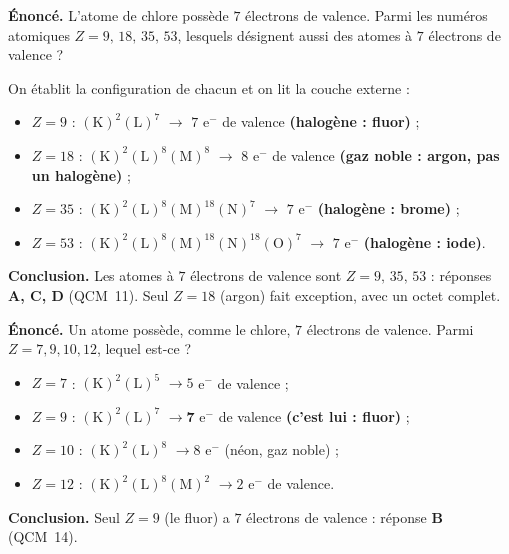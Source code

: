 \documentclass[11pt,a4paper]{article}
\begin{document}
\begin{exemple}
\textbf{Énoncé.} L'atome de chlore possède $7$ électrons de valence. Parmi les numéros atomiques
$Z = 9,\,18,\,35,\,53$, lesquels désignent aussi des atomes à $7$ électrons de valence ?

\smallskip
On établit la configuration de chacun et on lit la couche externe :
\begin{itemize}[leftmargin=1.6em,topsep=2pt,itemsep=2pt]
  \item $Z = 9$ : $(\mathrm{K})^2(\mathrm{L})^7$ \;$\to$\; $7$ e$^-$ de valence \;\textbf{\textcolor{excol}{(halogène : fluor)}} ;
  \item $Z = 18$ : $(\mathrm{K})^2(\mathrm{L})^8(\mathrm{M})^8$ \;$\to$\; $8$ e$^-$ de valence
        \;\textbf{\textcolor{attncol}{(gaz noble : argon, pas un halogène)}} ;
  \item $Z = 35$ : $(\mathrm{K})^2(\mathrm{L})^8(\mathrm{M})^{18}(\mathrm{N})^7$ \;$\to$\; $7$ e$^-$
        \;\textbf{\textcolor{excol}{(halogène : brome)}} ;
  \item $Z = 53$ : $(\mathrm{K})^2(\mathrm{L})^8(\mathrm{M})^{18}(\mathrm{N})^{18}(\mathrm{O})^7$
        \;$\to$\; $7$ e$^-$ \;\textbf{\textcolor{excol}{(halogène : iode)}}.
\end{itemize}
\textbf{Conclusion.} Les atomes à $7$ électrons de valence sont $Z = 9,\,35,\,53$ : réponses
\textbf{A, C, D} (QCM~11). Seul $Z = 18$ (argon) fait exception, avec un octet complet.
\end{exemple}

\begin{exemple}
\textbf{Énoncé.} Un atome possède, comme le chlore, $7$ électrons de valence. Parmi $Z = 7, 9, 10, 12$,
lequel est-ce ?

\smallskip
\begin{itemize}[leftmargin=1.6em,topsep=2pt,itemsep=1pt]
  \item $Z = 7$ : $(\mathrm{K})^2(\mathrm{L})^5$ $\to 5$ e$^-$ de valence ;
  \item $Z = 9$ : $(\mathrm{K})^2(\mathrm{L})^7$ $\to \mathbf{7}$ e$^-$ de valence \;\textbf{\textcolor{excol}{(c'est lui : fluor)}} ;
  \item $Z = 10$ : $(\mathrm{K})^2(\mathrm{L})^8$ $\to 8$ e$^-$ (néon, gaz noble) ;
  \item $Z = 12$ : $(\mathrm{K})^2(\mathrm{L})^8(\mathrm{M})^2$ $\to 2$ e$^-$ de valence.
\end{itemize}
\textbf{Conclusion.} Seul $Z = 9$ (le fluor) a $7$ électrons de valence : réponse \textbf{B} (QCM~14).
\end{exemple}
\end{document}
